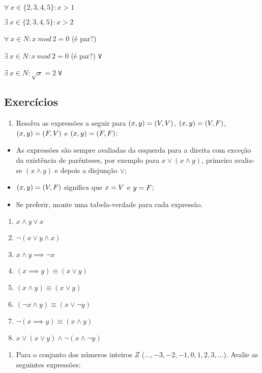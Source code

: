 \(\forall\ x \in \{2, 3, 4, 5\} : x > 1\)

\(\exists\ x \in \{2, 3, 4, 5\} : x > 2\)

    \(\forall\ x \in N : x\ mod\ 2 = 0\) (é par?) \texttt{\F}

\(\exists\ x \in N : x\ mod\ 2 = 0\) (é par?) \texttt{V}

\(\exists\ x \in N : \sqrt{x} = 2\) \texttt{V}

\subsection*{Exercícios}

\begin{enumerate}
\def\labelenumi{\arabic{enumi}.}
\item
  Resolva as expressões a seguir para \((x,y)=(V,V)\), \((x,y)=(V,F)\),
  \((x,y)=(F,V)\) e \((x,y)=(F,F)\):
\end{enumerate}

\begin{itemize}
\item
  As expressões são sempre avaliadas da esquerda para a direita com
  exceção da existência de parênteses, por exemplo para
  \(x \lor (x \land y)\), primeiro avalia-se \((x \land y)\) e depois a
  disjunção \(\lor\);
\item
  \((x,y)=(V,F)\) significa que \(x=V\) e \(y=F\);
\item
  Se preferir, monte uma tabela-verdade para cada expressão.
\end{itemize}

\begin{enumerate}
\def\labelenumi{\alph{enumi}.}
\item
  \(x\land y \lor x\)
\item
  \(\neg (x\lor y \land x)\)
\item
  \(x \land y \implies \neg x\)
\item
  \((x \implies y) \equiv (x \lor y)\)
\item
  \((x \land y) \equiv (x \lor y)\)
\item
  \((\neg x \land y) \equiv (x \lor \neg y)\)
\item
  \(\neg(x \implies y) \equiv (x \land y)\)
\item
  \(x \lor (x \lor y) \land \neg(x \land \neg y)\)
\end{enumerate}

\begin{enumerate}
\def\labelenumi{\arabic{enumi}.}
\setcounter{enumi}{1}
\item
  Para o conjunto dos números inteiros \(Z\)
  (\(\ldots, -3, -2, -1, 0, 1, 2, 3, \ldots\)). Avalie as seguintes
  expressões:
\end{enumerate}

